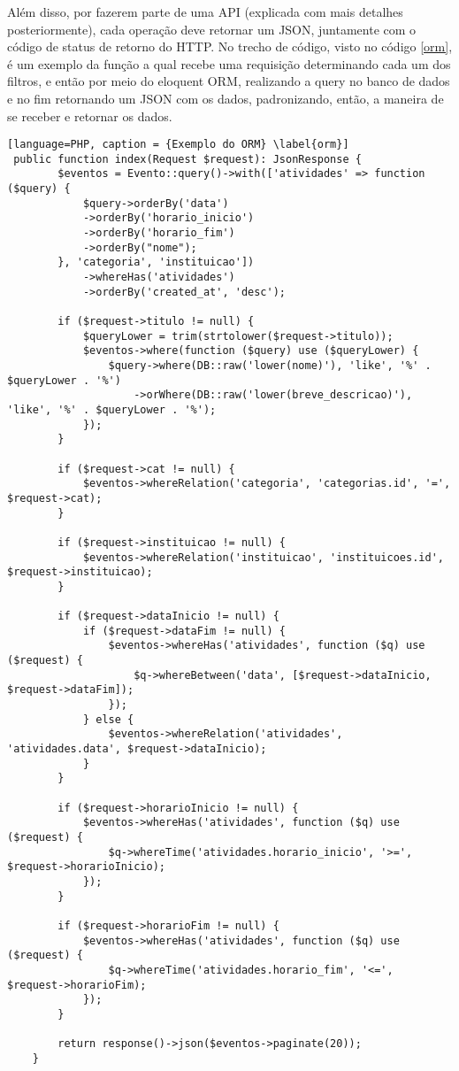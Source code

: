 Além disso, por fazerem parte de uma API (explicada com mais detalhes posteriormente), cada operação deve retornar um JSON, juntamente com o código de status de retorno do HTTP. No trecho de código, visto no código \ref{orm}, é um exemplo da função a qual recebe uma requisição determinando cada um dos filtros, e então por meio do eloquent ORM, realizando a query no banco de dados e no fim retornando um JSON com os dados, padronizando, então, a maneira de se receber e retornar os dados.
\begin{lstlisting}[language=PHP, caption = {Exemplo do ORM} \label{orm}]
 public function index(Request $request): JsonResponse {
        $eventos = Evento::query()->with(['atividades' => function ($query) {
            $query->orderBy('data')
            ->orderBy('horario_inicio')
            ->orderBy('horario_fim')
            ->orderBy("nome");
        }, 'categoria', 'instituicao'])
            ->whereHas('atividades')
            ->orderBy('created_at', 'desc');

        if ($request->titulo != null) {
            $queryLower = trim(strtolower($request->titulo));
            $eventos->where(function ($query) use ($queryLower) {
                $query->where(DB::raw('lower(nome)'), 'like', '%' . $queryLower . '%')
                    ->orWhere(DB::raw('lower(breve_descricao)'), 'like', '%' . $queryLower . '%');
            });
        }

        if ($request->cat != null) {
            $eventos->whereRelation('categoria', 'categorias.id', '=', $request->cat);
        }

        if ($request->instituicao != null) {
            $eventos->whereRelation('instituicao', 'instituicoes.id', $request->instituicao);
        }

        if ($request->dataInicio != null) {
            if ($request->dataFim != null) {
                $eventos->whereHas('atividades', function ($q) use ($request) {
                    $q->whereBetween('data', [$request->dataInicio, $request->dataFim]);
                });
            } else {
                $eventos->whereRelation('atividades', 'atividades.data', $request->dataInicio);
            }
        }

        if ($request->horarioInicio != null) {
            $eventos->whereHas('atividades', function ($q) use ($request) {
                $q->whereTime('atividades.horario_inicio', '>=', $request->horarioInicio);
            });
        }

        if ($request->horarioFim != null) {
            $eventos->whereHas('atividades', function ($q) use ($request) {
                $q->whereTime('atividades.horario_fim', '<=', $request->horarioFim);
            });
        }

        return response()->json($eventos->paginate(20));
    }
\end{lstlisting}

